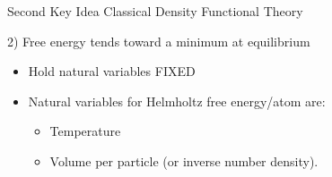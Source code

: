 \documentclass{beamer}
\renewcommand{\vec}[1]{\mathbf{#1}}
\begin{document}
\begin{frame}{Second Key Idea Classical Density Functional Theory}
    \begin{block}{2) Free energy tends toward a minimum at equilibrium }
    \begin{itemize}
       \item Hold natural variables FIXED
       \item Natural variables for Helmholtz free energy/atom are:
       
       \begin{itemize}
          \item Temperature 
          \item Volume per particle (or inverse number density). 
        \end{itemize}  
    \end{itemize}
    
     \end{block}     
\end{frame}
\end{document}
